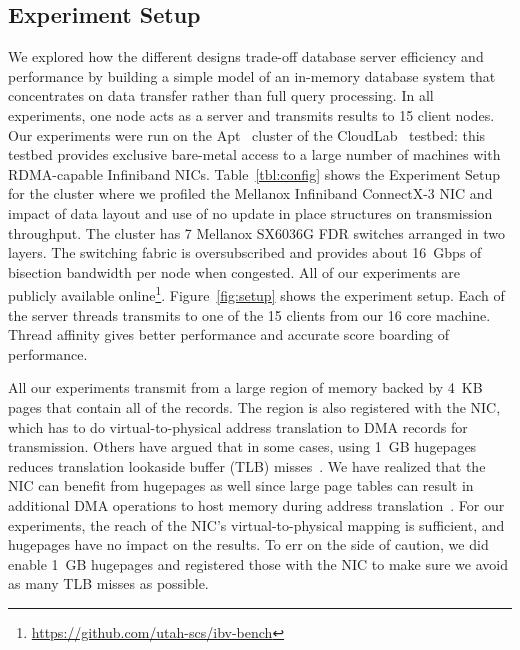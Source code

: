 \subsection{Experiment Setup}
We explored how the different designs trade-off database server efficiency and
performance by building a simple model of an in-memory database system that
concentrates on data transfer rather than full query processing. In all experiments,
one node acts as a server and transmits results to 15 client nodes.
Our experiments were run on the Apt~\cite{Ricci+:OSR15} cluster of the
CloudLab~\cite{Cloudlab:URL} testbed: this testbed provides exclusive bare-metal
access to a large number of machines with RDMA-capable Infiniband NICs.
Table~\ref{tbl:config} shows the Experiment Setup for the cluster where we profiled
the Mellanox Infiniband ConnectX-3 \textregistered NIC and impact of data layout and 
use of no update in place structures on transmission throughput. The cluster has 7
Mellanox SX6036G FDR switches arranged in two layers. The switching fabric is
oversubscribed and provides about 16~Gbps of bisection bandwidth per node
when congested. All of our experiments are publicly available online\footnote{\url{https://github.com/utah-scs/ibv-bench}}.
Figure~\ref{fig:setup} shows the experiment setup. Each of the server threads transmits to one of the 15 clients from our 16 core machine. 
Thread affinity gives better performance and accurate score boarding of performance.


All our experiments transmit from a large region of memory backed by 4~KB pages
that contain all of the records. The region is also
registered with the NIC, which has to do virtual-to-physical address
translation to DMA records for transmission.
Others have argued that in some cases, using 1~GB hugepages reduces translation lookaside buffer
(TLB) misses~\cite{infinibandhugepages}. We have realized that the NIC can benefit from
hugepages as well since large page tables can result in additional
DMA operations to host memory during address translation~\cite{farm,rdma}. For
our experiments, the reach of the NIC's virtual-to-physical mapping is
sufficient, and hugepages have no impact on the results. To err on the side of caution, 
we did enable 1~GB hugepages and registered those with the NIC to make sure we 
avoid as many TLB misses as possible.
